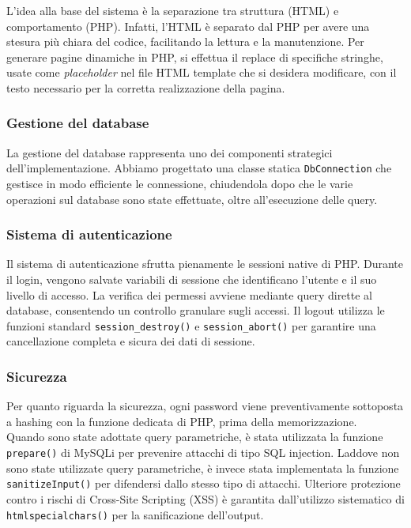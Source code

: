 \documentclass[a4paper, 12pt]{article}
\begin{document}
\begin{justify}
L'idea alla base del sistema è la separazione tra struttura (HTML) e comportamento (PHP). Infatti, l'HTML è separato dal PHP per avere una stesura più chiara del codice, facilitando la lettura e la manutenzione. Per generare pagine dinamiche in PHP, si effettua il replace di specifiche stringhe, usate come \textit{placeholder} nel file HTML template che si desidera modificare, con il testo necessario per la corretta realizzazione della pagina.

\subsubsection{Gestione del database}

La gestione del database rappresenta uno dei componenti strategici dell'implementazione. Abbiamo progettato una classe statica \texttt{DbConnection} che gestisce in modo efficiente le connessione, chiudendola dopo che le varie operazioni sul database sono state effettuate, oltre all'esecuzione delle query.

\subsubsection{Sistema di autenticazione}

Il sistema di autenticazione sfrutta pienamente le sessioni native di PHP. Durante il login, vengono salvate variabili di sessione che identificano l'utente e il suo livello di accesso. La verifica dei permessi avviene mediante query dirette al database, consentendo un controllo granulare sugli accessi. Il logout utilizza le funzioni standard \texttt{session\_destroy()} e \texttt{session\_abort()} per garantire una cancellazione completa e sicura dei dati di sessione.

\subsubsection{Sicurezza}

Per quanto riguarda la sicurezza, ogni password viene preventivamente sottoposta a hashing con la funzione dedicata di PHP, prima della memorizzazione.\\
Quando sono state adottate query parametriche, è stata utilizzata la funzione \texttt{prepare()} di MySQLi per prevenire attacchi di tipo SQL injection. Laddove non sono state utilizzate query parametriche, è invece stata implementata la funzione \texttt{sanitizeInput()} per difendersi dallo stesso tipo di attacchi. Ulteriore protezione contro i rischi di Cross-Site Scripting (XSS) è garantita dall'utilizzo sistematico di \texttt{htmlspecialchars()} per la sanificazione dell'output.


\end{justify}
\end{document}
